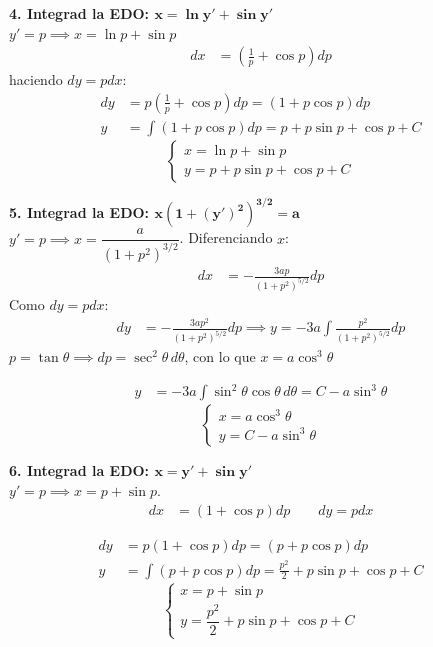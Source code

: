 \documentclass[11pt, a4paper]{article}
\begin{document}
\noindent\textbf{4. Integrad la EDO: $\bm{x = \ln y' + \sin y'}$} \\
$y' = p \implies x = \ln p + \sin p$
\begin{align*}
dx &= \left(\frac{1}{p} + \cos p\right)dp
\end{align*}
haciendo $dy = p dx$:
\begin{align*}
dy &= p\left(\frac{1}{p} + \cos p\right)dp = (1 + p\cos p)dp \\
y &= \int (1 + p\cos p)dp = p + p\sin p + \cos p + C
\end{align*}
\[
\boxed{\begin{cases} x = \ln p + \sin p \\ y = p + p\sin p + \cos p + C \end{cases}}
\]


\noindent\textbf{5. Integrad la EDO: $\bm{x(1+(y')^2)^{3/2} = a}$} \\
$y' = p \implies x = \dfrac{a}{(1+p^2)^{3/2}}$. Diferenciando $x$:
\begin{align*}
dx &= -\frac{3ap}{(1+p^2)^{5/2}}dp
\end{align*}
Como $dy = p dx$:
\begin{align*}
dy &= -\frac{3ap^2}{(1+p^2)^{5/2}}dp \implies y = -3a\int \frac{p^2}{(1+p^2)^{5/2}}dp
\end{align*}
$p = \tan\theta \implies dp = \sec^2\theta \, d\theta$, con lo que $x = a\cos^3\theta$

\begin{align*}
y &= -3a\int \sin^2\theta\cos\theta \, d\theta = C - a\sin^3\theta
\end{align*}
\[
\boxed{\begin{cases} x = a\cos^3\theta \\[1ex] y = C - a\sin^3\theta \end{cases}}
\]

\noindent\textbf{6. Integrad la EDO: $\bm{x = y' + \sin y'}$} \\
$y' = p \implies x = p + \sin p$.
\begin{align*}
dx &= (1 + \cos p)dp \quad\quad dy = p dx
\end{align*}

\begin{align*}
dy &= p(1 + \cos p)dp = (p + p\cos p)dp \\
y &= \int (p + p\cos p)dp = \frac{p^2}{2} + p\sin p + \cos p + C
\end{align*}
\[
\boxed{\begin{cases} x = p + \sin p \\ y = \dfrac{p^2}{2} + p\sin p + \cos p + C \end{cases}}
\]
\end{document}
